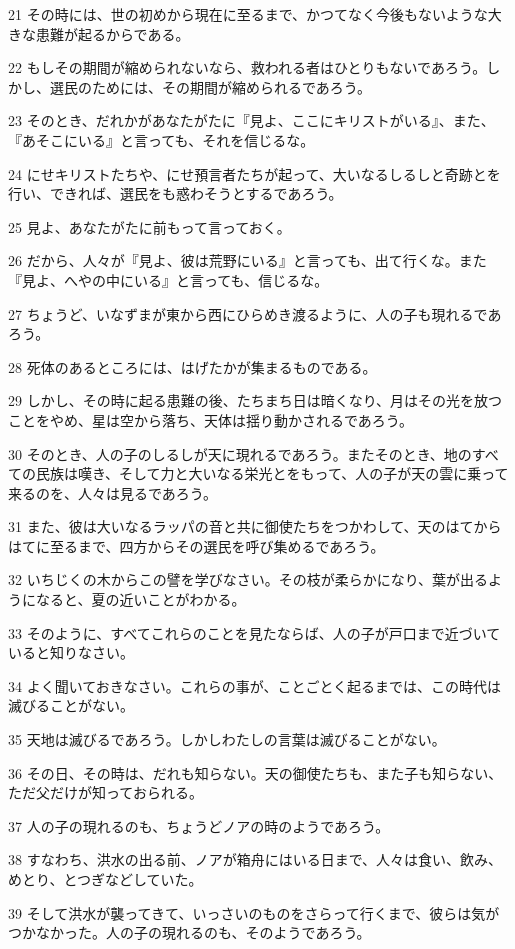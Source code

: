 \par 21 その時には、世の初めから現在に至るまで、かつてなく今後もないような大きな患難が起るからである。
\par 22 もしその期間が縮められないなら、救われる者はひとりもないであろう。しかし、選民のためには、その期間が縮められるであろう。
\par 23 そのとき、だれかがあなたがたに『見よ、ここにキリストがいる』、また、『あそこにいる』と言っても、それを信じるな。
\par 24 にせキリストたちや、にせ預言者たちが起って、大いなるしるしと奇跡とを行い、できれば、選民をも惑わそうとするであろう。
\par 25 見よ、あなたがたに前もって言っておく。
\par 26 だから、人々が『見よ、彼は荒野にいる』と言っても、出て行くな。また『見よ、へやの中にいる』と言っても、信じるな。
\par 27 ちょうど、いなずまが東から西にひらめき渡るように、人の子も現れるであろう。
\par 28 死体のあるところには、はげたかが集まるものである。
\par 29 しかし、その時に起る患難の後、たちまち日は暗くなり、月はその光を放つことをやめ、星は空から落ち、天体は揺り動かされるであろう。
\par 30 そのとき、人の子のしるしが天に現れるであろう。またそのとき、地のすべての民族は嘆き、そして力と大いなる栄光とをもって、人の子が天の雲に乗って来るのを、人々は見るであろう。
\par 31 また、彼は大いなるラッパの音と共に御使たちをつかわして、天のはてからはてに至るまで、四方からその選民を呼び集めるであろう。
\par 32 いちじくの木からこの譬を学びなさい。その枝が柔らかになり、葉が出るようになると、夏の近いことがわかる。
\par 33 そのように、すべてこれらのことを見たならば、人の子が戸口まで近づいていると知りなさい。
\par 34 よく聞いておきなさい。これらの事が、ことごとく起るまでは、この時代は滅びることがない。
\par 35 天地は滅びるであろう。しかしわたしの言葉は滅びることがない。
\par 36 その日、その時は、だれも知らない。天の御使たちも、また子も知らない、ただ父だけが知っておられる。
\par 37 人の子の現れるのも、ちょうどノアの時のようであろう。
\par 38 すなわち、洪水の出る前、ノアが箱舟にはいる日まで、人々は食い、飲み、めとり、とつぎなどしていた。
\par 39 そして洪水が襲ってきて、いっさいのものをさらって行くまで、彼らは気がつかなかった。人の子の現れるのも、そのようであろう。
